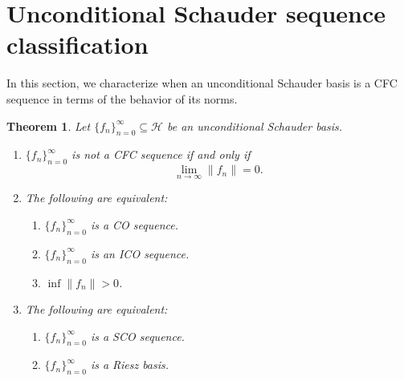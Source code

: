\documentclass[11pt]{amsart}
\newtheorem{thm}{Theorem}[section]
\theoremstyle{definition}
\numberwithin{equation}{section}
\newcommand{\Hcal}{\mathcal{H}} %
\begin{document}
\section{Unconditional Schauder sequence classification}\label{5}
In this section, we characterize when an unconditional Schauder basis is a CFC sequence in terms of the behavior of its norms.
\begin{thm}
 Let $\{f_n\}_{n=0}^{\infty}\subseteq \Hcal$ be an unconditional Schauder basis. 
 
 \begin{enumerate}
     \item $\{f_n\}_{n=0}^{\infty}$ is not a CFC sequence if and only if $$\lim_{n\to \infty}\|f_n\|=0.$$
     \item The following are equivalent:
     \begin{enumerate}
      \item $\{f_n\}_{n=0}^{\infty}$ is a CO sequence.
     \item $\{f_n\}_{n=0}^{\infty}$ is an ICO sequence.
    \item $\inf \|f_n\|>0$.
     \end{enumerate} 
     \item The following are equivalent:
     \begin{enumerate}
         \item $\{f_n\}_{n=0}^{\infty}$ is a SCO sequence.
         \item $\{f_n\}_{n=0}^{\infty}$ is a Riesz basis.
     \end{enumerate}
     
 \end{enumerate}
\end{thm}
\end{document}
